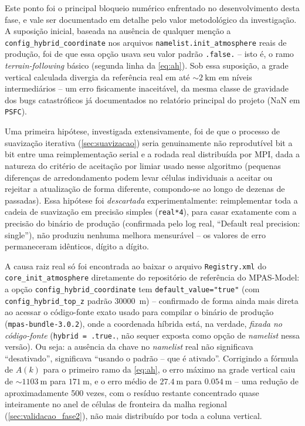 \begin{caixaachado}
\label{achado:hybrid}
Este ponto foi o principal bloqueio numérico enfrentado no
desenvolvimento desta fase, e vale ser documentado em detalhe pelo valor
metodológico da investigação. A suposição inicial, baseada na ausência
de qualquer menção a \texttt{config\_hybrid\_coordinate} nos arquivos
\texttt{namelist.init\_atmosphere} reais de produção, foi de que essa
opção usava seu valor padrão \texttt{.false.} -- isto é, o ramo
\textit{terrain-following} básico (segunda linha da
\cref{eq:ah}). Sob essa suposição, a grade vertical calculada
divergia da referência real em até $\sim\SI{2}{\kilo\metre}$ em níveis
intermediários -- um erro fisicamente inaceitável, da mesma classe de
gravidade dos bugs catastróficos já documentados no relatório principal
do projeto (NaN em \texttt{PSFC}).

Uma primeira hipótese, investigada extensivamente, foi de que o processo
de suavização iterativa (\cref{sec:suavizacao}) seria genuinamente não
reprodutível bit a bit entre uma reimplementação serial e a rodada real
distribuída por MPI, dada a natureza do critério de aceitação por limiar
usado nesse algoritmo (pequenas diferenças de arredondamento podem levar
células individuais a aceitar ou rejeitar a atualização de forma
diferente, compondo-se ao longo de dezenas de passadas). Essa hipótese
foi \emph{descartada} experimentalmente: reimplementar toda a cadeia de
suavização em precisão simples (\texttt{real*4}), para casar exatamente
com a precisão do binário de produção (confirmada pelo log real,
``Default real precision: single''), não produziu nenhuma melhora
mensurável -- os valores de erro permaneceram idênticos, dígito a dígito.

A causa raiz real só foi encontrada ao baixar o arquivo
\texttt{Registry.xml} do \texttt{core\_init\_atmosphere} diretamente do
repositório de referência do MPAS-Model: a opção
\texttt{config\_hybrid\_coordinate} tem \texttt{default\_value="true"}
(com \texttt{config\_hybrid\_top\_z} padrão \SI{30000}{\metre}) --
confirmado de forma ainda mais direta ao acessar o código-fonte exato
usado para compilar o binário de produção (\texttt{mpas-bundle-3.0.2}),
onde a coordenada híbrida está, na verdade, \emph{fixada no
código-fonte} (\texttt{hybrid = .true.}, não sequer exposta como opção de
\textit{namelist} nessa versão). Ou seja: a ausência da chave no
\textit{namelist} real não significava ``desativado'', significava
``usando o padrão -- que é ativado''. Corrigindo a fórmula de $A(k)$ para
o primeiro ramo da \cref{eq:ah}, o erro máximo na grade vertical caiu de
$\sim\SI{1103}{\metre}$ para $\SI{171}{\metre}$, e o erro médio de
$\SI{27,4}{\metre}$ para $\SI{0,054}{\metre}$ -- uma redução de
aproximadamente 500 vezes, com o resíduo restante concentrado quase
inteiramente no anel de células de fronteira da malha regional
(\cref{sec:validacao_fase2}), não mais distribuído por toda a coluna
vertical.


\end{caixaachado}
